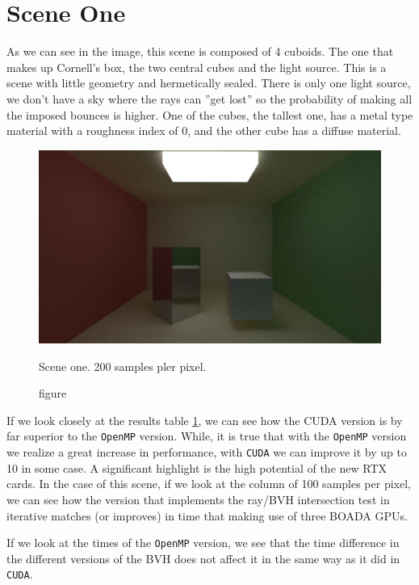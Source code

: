 \documentclass[titlepage,12pt]{report}
\begin{document}
\section{Scene One}

As we can see in the image, this scene is composed of 4 cuboids. The one that makes up Cornell's box, the two central cubes and the light source. This is a scene with little geometry and hermetically sealed. There is only one light source, we don't have a sky where the rays can ''get lost'' so the probability of making all the imposed bounces is higher. One of the cubes, the tallest one, has a metal type material with a roughness index of 0, and the other cube has a diffuse material.

\begin{figure}[H]
	\centering
	\includegraphics[scale=0.50]{media/cornell_normal.png}
	\caption{figure}{Scene one. 200 samples pler pixel.}
	\label{sc1}
\end{figure}

If we look closely at the results table \ref{sc1}, we can see how the CUDA version is by far superior to the \texttt{OpenMP} version. While, it is true that with the \texttt{OpenMP} version we realize a great increase in performance, with \texttt{CUDA} we can improve it by up to 10 in some case. A significant highlight is the high potential of the new RTX cards. In the case of this scene, if we look at the column of 100 samples per pixel, we can see how the version that implements the ray/BVH intersection test in iterative matches (or improves) in time that making use of three BOADA GPUs.

If we look at the times of the \texttt{OpenMP} version, we see that the time difference in the different versions of the BVH does not affect it in the same way as it did in \texttt{CUDA}. 
\end{document}
